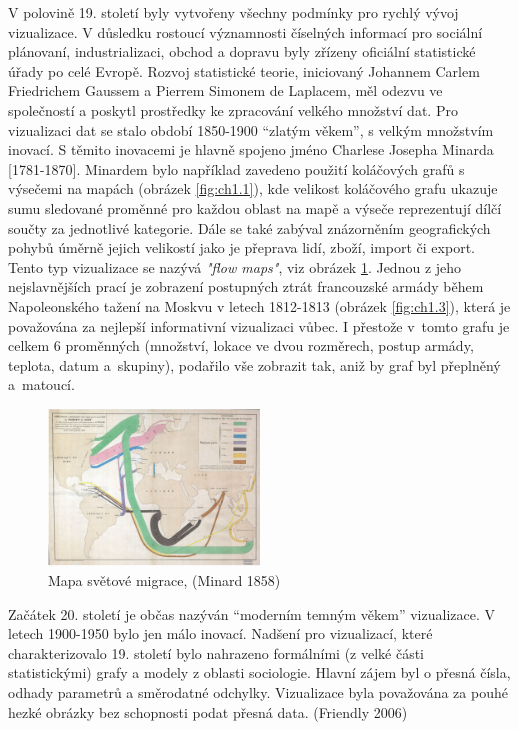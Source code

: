 \documentclass[12pt,]{article}
\begin{document}
\qquad V polovině 19. století byly vytvořeny všechny podmínky pro rychlý
vývoj vizualizace. V důsledku rostoucí významnosti číselných informací
pro sociální plánovaní, industrializaci, obchod a dopravu byly zřízeny
oficiální statistické úřady po celé Evropě. Rozvoj statistické teorie,
iniciovaný Johannem Carlem Friedrichem Gaussem a Pierrem Simonem de
Laplacem, měl odezvu ve společností a poskytl prostředky ke zpracování
velkého množství dat. Pro vizualizaci dat se stalo období
\mbox{1850-1900} \enquote{zlatým věkem}, s velkým množstvím inovací. S
těmito inovacemi je hlavně spojeno jméno Charlese Josepha Minarda
{[}1781-1870{]}. Minardem bylo například zavedeno použití koláčových
grafů s výsečemi na mapách (obrázek \ref{fig:ch1.1}), kde velikost
koláčového grafu ukazuje sumu sledované proměnné pro každou oblast na
mapě a výseče reprezentují dílčí součty za jednotlivé kategorie. Dále se
také zabýval znázorněním geografických pohybů úměrně jejich velikostí
jako je přeprava lidí, zboží, import či export. Tento typ vizualizace se
nazývá \textit{"flow maps"}, viz obrázek \ref{fig:ch1.2}. Jednou z jeho
nejslavnějších prací je zobrazení postupných ztrát francouzské armády
během Napoleonského tažení na Moskvu v letech 1812-1813 (obrázek
\ref{fig:ch1.3}), která je považována za nejlepší informativní
vizualizaci vůbec. I přestože v~tomto grafu je celkem 6 proměnných
(množství, lokace ve dvou rozměrech, postup armády, teplota, datum
a~skupiny), podařilo vše zobrazit tak, aniž by graf byl přeplněný
a~\mbox{matoucí.}

\begin{figure}
    \centering
    \vspace*{-20pt}
    \includegraphics[width=0.5\textwidth]{fig/minard_flow_map.jpg}
    \vspace{-5pt}
    \caption{Mapa světové migrace, (Minard 1858)}
    \label{fig:ch1.2}
\end{figure}

\vspace{2.5pt} \qquad Začátek 20. století je občas nazýván
\enquote{moderním temným věkem} vizualizace. V letech 1900-1950 bylo jen
málo inovací. Nadšení pro vizualizací, které charakterizovalo 19.
století bylo nahrazeno formálními (z velké části statistickými) grafy a
modely z oblasti sociologie. Hlavní zájem byl o přesná čísla, odhady
parametrů a směrodatné odchylky. Vizualizace byla považována za pouhé
hezké obrázky bez schopnosti podat přesná data. (Friendly 2006)
\end{document}
